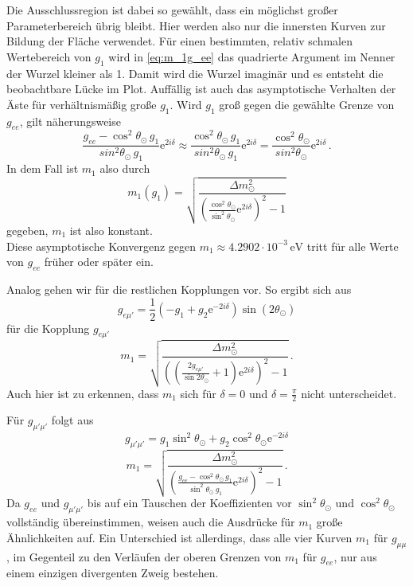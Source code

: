 Die Ausschlussregion ist dabei so gewählt, dass ein möglichst großer Parameterbereich übrig bleibt.
Hier werden also nur die innersten Kurven zur Bildung der Fläche verwendet.
Für einen bestimmten, relativ schmalen Wertebereich von $g_1$ wird in \eqref{eq:m_1g_ee} das quadrierte Argument im Nenner der Wurzel kleiner als 1.
Damit wird die Wurzel imaginär und es entsteht die beobachtbare Lücke im Plot.
Auffällig ist auch das asymptotische Verhalten der Äste für verhältnismäßig große $g_1$.
Wird $g_1$ groß gegen die gewählte Grenze von $g_{ee}$, gilt näherungsweise 
\begin{equation*}
    \frac{g_{ee} -  \cos^2 \theta_\odot \, g_1}{sin^2 \theta_\odot \, g_1} \mathrm{e}^{2 i \delta} \approx \frac{\cos^2 \theta_\odot \, g_1}{sin^2 \theta_\odot \, g_1} \mathrm{e}^{2 i \delta}
    = \frac{\cos^2 \theta_\odot}{sin^2 \theta_\odot} \mathrm{e}^{2 i \delta} \,.
\end{equation*}
In dem Fall ist $m_1$ also durch
\begin{equation*}
    m_1 (g_1) = \sqrt{\frac{\Delta m^2_\odot}{ \left(\frac{\cos^2 \theta_\odot}{\sin^2 \theta_\odot} \mathrm{e}^{2 i \delta}\right)^2 - 1}}
\end{equation*}
gegeben, $m_1$ ist also konstant. \\
Diese asymptotische Konvergenz gegen $m_1 \approx \num{4.2902} \cdot 10^{-3} \, \si{\eV}$ tritt für alle Werte von $g_{ee}$ früher oder später ein.

Analog gehen wir für die restlichen Kopplungen vor.
So ergibt sich aus
\begin{equation*}
    g_{e \mu'} = \frac{1}{2} \left(-g_1 + g_2 \mathrm{e}^{-2 i \delta}\right) \sin(2 \theta_\odot)
\end{equation*}
für die Kopplung $g_{e \mu'}$
\begin{equation}
    m_1 = \sqrt{\frac{\Delta m^2_\odot}{\left( \left(\frac{2 g_{e \mu'}}{\sin{2 \theta_\odot}} + 1 \right) \mathrm{e}^{2 i \delta}\right)^2 - 1}} \,.
    \label{eq:g_emu}
\end{equation}
Auch hier ist zu erkennen, dass $m_1$ sich für $\delta = 0$ und $\delta = \frac{\pi}{2}$ nicht unterscheidet.

Für $g_{\mu' \mu'}$ folgt aus
\begin{equation*}
    g_{\mu' \mu'} = g_1 \sin^2 \theta_\odot + g_2 \cos^2 \theta_\odot\mathrm{e}^{-2 i \delta}
\end{equation*}
\begin{equation}
    m_1 = \sqrt{\frac{\Delta m^2_\odot}{\left(\frac{g_{ee} -  \cos^2 \theta_\odot \, g_1}{\sin^2 \theta_\odot \, g_1} \mathrm{e}^{2 i \delta} \right)^2 - 1}} \,.
    \label{eq:m_1g_mumu}
\end{equation}
Da $g_{ee}$ und $g_{\mu' \mu'}$ bis auf ein Tauschen der Koeffizienten vor $\sin^2\theta_\odot$ und $\cos^2\theta_\odot$ vollständig übereinstimmen, weisen auch die Ausdrücke für $m_1$ große Ähnlichkeiten auf.
Ein Unterschied ist allerdings, dass alle vier Kurven $m_1$ für $g_{\mu \mu}$, im Gegenteil zu den Verläufen der oberen Grenzen von $m_1$ für $g_{ee}$, nur aus einem einzigen divergenten Zweig bestehen.

